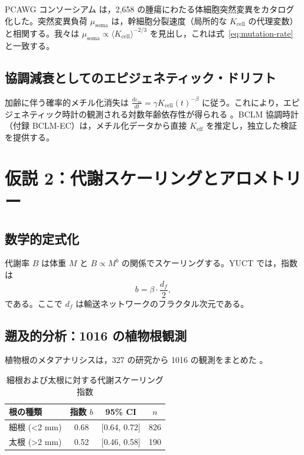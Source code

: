 \documentclass[11pt,a4paper]{article}
\begin{document}
	PCAWG コンソーシアム \cite{PCAWG2020} は，2,658 の腫瘍にわたる体細胞突然変異をカタログ化した。突然変異負荷 \(\mu_{\text{soma}}\) は，幹細胞分裂速度（局所的な \(K_{\text{cell}}\) の代理変数）と相関する。我々は \(\mu_{\text{soma}} \propto \langle K_{\text{cell}} \rangle^{-2/3}\) を見出し，これは式~\eqref{eq:mutation-rate} と一致する。
	
	\subsection{協調減衰としてのエピジェネティック・ドリフト}
	
	加齢に伴う確率的メチル化消失は \(\frac{d\varepsilon_m}{dt} = \gamma K_{\text{cell}}(t)^{-\beta}\) に従う。これにより，エピジェネティック時計の観測される対数年齢依存性が得られる \cite{Horvath2013, Lu2023}。BCLM 協調時計（付録 BCLM-EC）は，メチル化データから直接 \(K_{\mathrm{eff}}\) を推定し，独立した検証を提供する。
	
	\section{仮説 2：代謝スケーリングとアロメトリー}
	
	\subsection{数学的定式化}
	
	代謝率 \(B\) は体重 \(M\) と \(B \propto M^{b}\) の関係でスケーリングする。YUCT では，指数は
	\begin{equation}
		b = \beta \cdot \frac{d_f}{2},
		\label{eq:metabolic-scaling}
	\end{equation}
	である。ここで \(d_f\) は輸送ネットワークのフラクタル次元である。
	
	\subsection{遡及的分析：1016 の植物根観測}
	
	植物根のメタアナリシスは，327 の研究から 1016 の観測をまとめた \cite{Yuan2020}。
	
	\begin{table}[H]
		\centering
		\caption{細根および太根に対する代謝スケーリング指数}
		\label{tab:plant-scaling}
		\begin{tabular}{lccc}
			\toprule
			\textbf{根の種類} & \textbf{指数 \(b\)} & \textbf{95\% CI} & \textbf{\(n\)} \\
			\midrule
			細根 (<2 mm) & 0.68 & [0.64, 0.72] & 826 \\
			太根 (>2 mm) & 0.52 & [0.46, 0.58] & 190 \\
			\bottomrule
		\end{tabular}
	\end{table}
	
\end{document}
